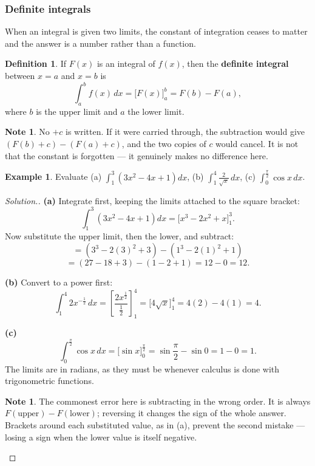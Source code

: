 \documentclass[11pt,a4paper]{article}
\theoremstyle{definition}
\newtheorem{definition}[thm]{Definition}
\newtheorem{example}[thm]{Example}
\newtheorem{note}[thm]{Note}
\newenvironment{solution}
  {\renewcommand{\qedsymbol}{}\begin{proof}[\textit{Solution}.]}
  {\end{proof}}
\begin{document}
\subsubsection{Definite integrals}

When an integral is given two limits, the constant of integration ceases to matter and
the answer is a number rather than a function.

\begin{definition}
If $F(x)$ is an integral of $f(x)$, then the \textbf{definite integral} between
$x=a$ and $x=b$ is
$$\int_a^b f(x)\,dx=\Big[F(x)\Big]_a^b=F(b)-F(a),$$
where $b$ is the upper limit and $a$ the lower limit.
\end{definition}

\begin{note}
No $+c$ is written. If it were carried through, the subtraction would give
$\left(F(b)+c\right)-\left(F(a)+c\right)$, and the two copies of $c$ would cancel. It is
not that the constant is forgotten --- it genuinely makes no difference here.
\end{note}

\begin{example}
Evaluate \quad (a) $\displaystyle\int_1^3\left(3x^2-4x+1\right)dx$, \quad
(b) $\displaystyle\int_1^4\frac{2}{\sqrt{x}}\,dx$, \quad
(c) $\displaystyle\int_0^{\frac{\pi}{2}}\cos x\,dx$.
\end{example}

\begin{solution}
\textbf{(a)} Integrate first, keeping the limits attached to the square bracket:
$$\int_1^3\left(3x^2-4x+1\right)dx=\Big[x^3-2x^2+x\Big]_1^3.$$
Now substitute the upper limit, then the lower, and subtract:
$$=\left(3^3-2(3)^2+3\right)-\left(1^3-2(1)^2+1\right)$$
$$=\left(27-18+3\right)-\left(1-2+1\right)=12-0=12.$$

\textbf{(b)} Convert to a power first:
$$\int_1^4 2x^{-\frac{1}{2}}\,dx=\left[\frac{2x^{\frac{1}{2}}}{\frac{1}{2}}\right]_1^4
=\Big[4\sqrt{x}\Big]_1^4=4(2)-4(1)=4.$$

\textbf{(c)}
$$\int_0^{\frac{\pi}{2}}\cos x\,dx=\Big[\sin x\Big]_0^{\frac{\pi}{2}}
=\sin\frac{\pi}{2}-\sin 0=1-0=1.$$
The limits are in radians, as they must be whenever calculus is done with trigonometric
functions.

\begin{note}
The commonest error here is subtracting in the wrong order. It is always
$F(\text{upper})-F(\text{lower})$; reversing it changes the sign of the whole answer.
Brackets around each substituted value, as in (a), prevent the second mistake --- losing
a sign when the lower value is itself negative.
\end{note}
\end{solution}
\end{document}
